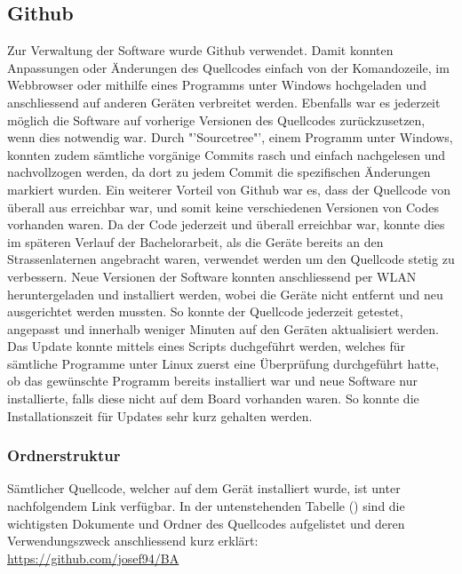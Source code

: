 \subsection{Github}
Zur Verwaltung der Software wurde Github verwendet. Damit konnten Anpassungen oder Änderungen des Quellcodes einfach von der Komandozeile, im Webbrowser oder mithilfe eines Programms unter Windows hochgeladen und anschliessend auf anderen Geräten verbreitet werden. Ebenfalls war es jederzeit möglich die Software auf vorherige Versionen des Quellcodes zurückzusetzen, wenn dies notwendig war. Durch "'Sourcetree"', einem Programm unter Windows, konnten zudem sämtliche vorgänige Commits rasch und einfach nachgelesen und nachvollzogen werden, da dort zu jedem Commit die spezifischen Änderungen markiert wurden. Ein weiterer Vorteil von Github war es, dass der Quellcode von überall aus erreichbar war, und somit keine verschiedenen Versionen von Codes vorhanden waren. Da der Code jederzeit und überall erreichbar war, konnte dies im späteren Verlauf der Bachelorarbeit, als die Geräte bereits an den Strassenlaternen angebracht waren, verwendet werden um den Quellcode stetig zu verbessern. Neue Versionen der Software konnten anschliessend per WLAN heruntergeladen und installiert werden, wobei die Geräte nicht entfernt und neu ausgerichtet werden mussten. So konnte der Quellcode jederzeit getestet, angepasst und innerhalb weniger Minuten auf den Geräten aktualisiert werden. Das Update konnte mittels eines Scripts duchgeführt werden, welches für sämtliche Programme unter Linux zuerst eine Überprüfung durchgeführt hatte, ob das gewünschte Programm bereits installiert war und neue Software nur installierte, falls diese nicht auf dem Board vorhanden waren. So konnte die Installationszeit für Updates sehr kurz gehalten werden.

\subsubsection{Ordnerstruktur}
Sämtlicher Quellcode, welcher auf dem Gerät installiert wurde, ist unter nachfolgendem Link verfügbar. In der untenstehenden Tabelle () sind die wichtigsten Dokumente und Ordner des Quellcodes aufgelistet und deren Verwendungszweck anschliessend kurz erklärt:\\

\url{https://github.com/josef94/BA}\\

\setlength\tabcolsep{5pt}

